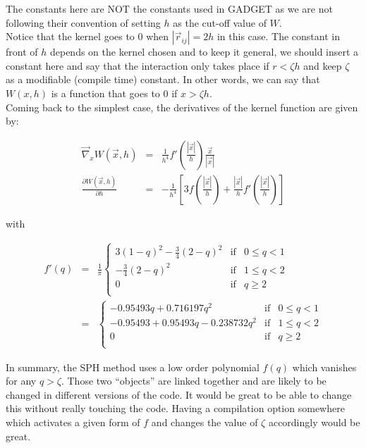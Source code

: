 \documentclass[a4paper,10pt]{article}
\begin{document}
The constants here are NOT the constants used in GADGET as we are not following their convention of setting $h$ as the
cut-off value of $W$.\\
Notice that the kernel goes to $0$ when $|\vec{r}_{ij}| = 2h$ in this case. The constant in front of $h$ depends on the
kernel
chosen and to keep it general, we should insert a constant here and say that the interaction only takes place if
$r<\zeta h$ and keep $\zeta$ as a modifiable (compile time) constant. In other words, we can say that $W(x,h)$ is a
function that goes to $0$ if $x > \zeta h$. \\
Coming back to the simplest case, the derivatives of the kernel function are given by:

\begin{eqnarray*}
 \vec\nabla_x W(\vec{x},h) &=& \frac{1}{h^4}f'\left(\frac{|\vec{x}|}{h}\right) \frac{\vec{x}}{|\vec{x}|} \\
 \frac{\partial W(\vec{x},h)}{\partial h} &=&- \frac{1}{h^4}\left[3f\left(\frac{|\vec{x}|}{h}\right) + 
\frac{|\vec{x}|}{h}f'\left(\frac{|\vec{x}|}{h}\right)\right]
\end{eqnarray*}

with

\begin{eqnarray*}
  f'(q)&=& \frac{1}{\pi}\left\lbrace \begin{array}{rcl}
                      3 \left(1-q\right)^2-\frac{3}{4} \left(2-q\right)^2 & \mbox{if} &
0 \leq q < 1 \\
 		      -\frac{3}{4} \left(2-q\right)^2 & \mbox{if} & 1 \leq q < 2 \\
		      0 & \mbox{if} & q \geq 2 \\
                     \end{array}
 \right. \\
&=&\left\lbrace \begin{array}{rcl}
    -0.95493 q + 0.716197 q^2& \mbox{if} & 0 \leq q < 1 \\
   -0.95493+0.95493 q-0.238732 q^2  & \mbox{if} & 1 \leq q < 2 \\
		      0 & \mbox{if} & q \geq 2 \\
                     \end{array}
 \right.
\end{eqnarray*}

In summary, the SPH method uses a low order polynomial $f(q)$ which vanishes for any $q>\zeta$. Those two ``objects''
are linked together and are likely to be changed in different versions of the code. It would be great to be able to
change this without really touching the code. 
Having a compilation option somewhere which activates a given form of $f$ and changes the value of $\zeta$ accordingly
would be great.
\end{document}

